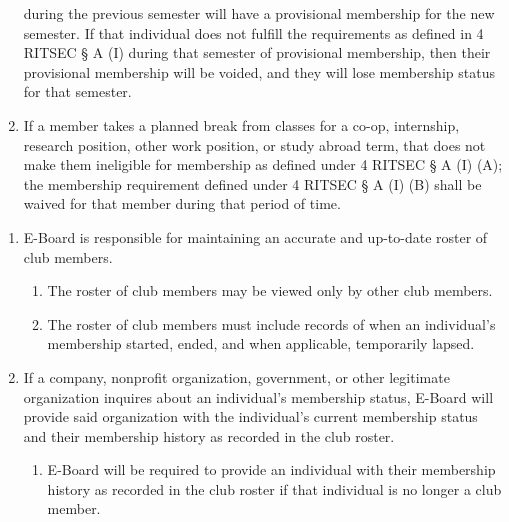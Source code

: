 \begin{enumerate}
	      during the previous semester will have a provisional membership for the new
	      semester. If that individual does not fulfill the requirements as defined in 4
	      RITSEC § A (I) during that semester of provisional membership, then their
	      provisional membership will be voided, and they will lose membership status for
	      that semester.
	\item If a member takes a planned break from classes for a co-op, internship,
	      research position, other work position, or study abroad term, that does not
	      make them ineligible for membership as defined under 4 RITSEC § A (I) (A); the
	      membership requirement defined under 4 RITSEC § A (I) (B) shall be waived for
	      that member during that period of time.
\end{enumerate}


\begin{enumerate}
	\item E-Board is responsible for maintaining an accurate and up-to-date roster of
	      club members.
	      \begin{enumerate}
		      \item The roster of club members may be viewed only by other club members.
		      \item The roster of club members must include records of when an individual's
		            membership started, ended, and when applicable, temporarily lapsed.
	      \end{enumerate}
	\item If a company, nonprofit organization, government, or other legitimate
	      organization inquires about an individual's membership status, E-Board will
	      provide said organization with the individual's current membership status and
	      their membership history as recorded in the club roster.
	      \begin{enumerate}
		      \item E-Board will be required to provide an individual with their membership history
		            as recorded in the club roster if that individual is no longer a club member.
	      \end{enumerate}
\end{enumerate}